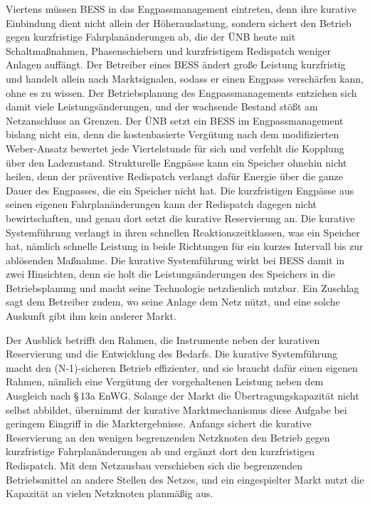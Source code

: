 Viertens müssen \ac{BESS} in das Engpassmanagement eintreten, denn ihre kurative Einbindung dient nicht allein der Höherauslastung, sondern sichert den Betrieb gegen kurzfristige Fahrplanänderungen ab, die der \ac{ÜNB} heute mit Schaltmaßnahmen, Phasenschiebern und kurzfristigem Redispatch weniger Anlagen auffängt.
Der Betreiber eines \ac{BESS} ändert große Leistung kurzfristig und handelt allein nach Marktsignalen, sodass er einen Engpass verschärfen kann, ohne es zu wissen.
Der Betriebsplanung des Engpassmanagements entziehen sich damit viele Leistungsänderungen, und der wachsende Bestand stößt am Netzanschluss an Grenzen.
Der \ac{ÜNB} setzt ein \ac{BESS} im Engpassmanagement bislang nicht ein, denn die kostenbasierte Vergütung nach dem modifizierten Weber-Ansatz bewertet jede Viertelstunde für sich und verfehlt die Kopplung über den Ladezustand.
Strukturelle Engpässe kann ein Speicher ohnehin nicht heilen, denn der präventive Redispatch verlangt dafür Energie über die ganze Dauer des Engpasses, die ein Speicher nicht hat.
Die kurzfristigen Engpässe aus seinen eigenen Fahrplanänderungen kann der Redispatch dagegen nicht bewirtschaften, und genau dort setzt die kurative Reservierung an.
Die kurative Systemführung verlangt in ihren schnellen Reaktionszeitklassen, was ein Speicher hat, nämlich schnelle Leistung in beide Richtungen für ein kurzes Intervall bis zur ablösenden Maßnahme.
Die kurative Systemführung wirkt bei \ac{BESS} damit in zwei Hinsichten, denn sie holt die Leistungsänderungen des Speichers in die Betriebsplanung und macht seine Technologie netzdienlich nutzbar.
Ein Zuschlag sagt dem Betreiber zudem, wo seine Anlage dem Netz nützt, und eine solche Auskunft gibt ihm kein anderer Markt.

Der Ausblick betrifft den Rahmen, die Instrumente neben der kurativen Reservierung und die Entwicklung des Bedarfs.
Die kurative Systemführung macht den (N-1)-sicheren Betrieb effizienter, und sie braucht dafür einen eigenen Rahmen, nämlich eine Vergütung der vorgehaltenen Leistung neben dem Ausgleich nach §\,13a \ac{EnWG}.
Solange der Markt die Übertragungskapazität nicht selbst abbildet, übernimmt der kurative Marktmechanismus diese Aufgabe bei geringem Eingriff in die Marktergebnisse.
Anfangs sichert die kurative Reservierung an den wenigen begrenzenden Netzknoten den Betrieb gegen kurzfristige Fahrplanänderungen ab und ergänzt dort den kurzfristigen Redispatch.
Mit dem Netzausbau verschieben sich die begrenzenden Betriebsmittel an andere Stellen des Netzes, und ein eingespielter Markt nutzt die Kapazität an vielen Netzknoten planmäßig aus.

